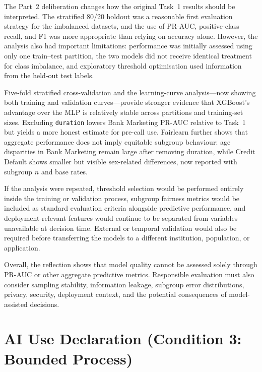 \documentclass[11pt,a4paper]{article}
\begin{document}
The Part~2 deliberation changes how the original Task~1 results should be interpreted.
The stratified 80/20 holdout was a reasonable first evaluation strategy for the
imbalanced datasets, and the use of PR-AUC, positive-class recall, and F1 was more
appropriate than relying on accuracy alone. However, the analysis also had important
limitations: performance was initially assessed using only one train--test partition,
the two models did not receive identical treatment for class imbalance, and exploratory
threshold optimisation used information from the held-out test labels.

Five-fold stratified cross-validation and the learning-curve analysis---now showing
both training and validation curves---provide stronger evidence that XGBoost's
advantage over the MLP is relatively stable across partitions and training-set sizes.
Excluding \texttt{duration} lowers Bank Marketing PR-AUC relative to Task~1 but yields
a more honest estimate for pre-call use. Fairlearn further shows that aggregate
performance does not imply equitable subgroup behaviour: age disparities in Bank
Marketing remain large after removing duration, while Credit Default shows smaller but
visible sex-related differences, now reported with subgroup $n$ and base rates.

If the analysis were repeated, threshold selection would be performed entirely inside
the training or validation process, subgroup fairness metrics would be included as
standard evaluation criteria alongside predictive performance, and deployment-relevant
features would continue to be separated from variables unavailable at decision time.
External or temporal validation would also be required before transferring the models
to a different institution, population, or application.

Overall, the reflection shows that model quality cannot be assessed solely through
PR-AUC or other aggregate predictive metrics. Responsible evaluation must also consider
sampling stability, information leakage, subgroup error distributions, privacy,
security, deployment context, and the potential consequences of model-assisted
decisions.


\newpage

\section{AI Use Declaration (Condition 3: Bounded Process)}
\label{sec:ai-declaration}
\end{document}
